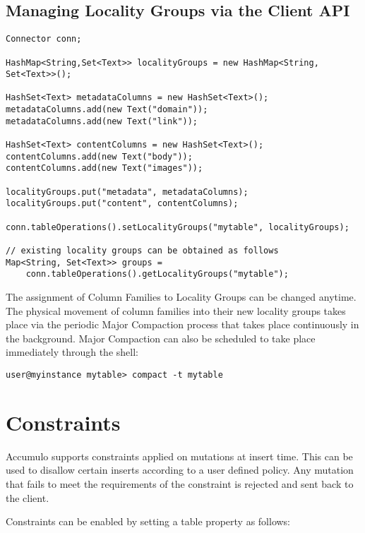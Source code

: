 \subsection{Managing Locality Groups via the Client API}

\begingroup\fontsize{8pt}{8pt}\selectfont\begin{verbatim}
Connector conn;

HashMap<String,Set<Text>> localityGroups = new HashMap<String, Set<Text>>();

HashSet<Text> metadataColumns = new HashSet<Text>();
metadataColumns.add(new Text("domain"));
metadataColumns.add(new Text("link"));

HashSet<Text> contentColumns = new HashSet<Text>();
contentColumns.add(new Text("body"));
contentColumns.add(new Text("images"));

localityGroups.put("metadata", metadataColumns);
localityGroups.put("content", contentColumns);

conn.tableOperations().setLocalityGroups("mytable", localityGroups);

// existing locality groups can be obtained as follows
Map<String, Set<Text>> groups =
    conn.tableOperations().getLocalityGroups("mytable");
\end{verbatim}\endgroup

The assignment of Column Families to Locality Groups can be changed anytime. The
physical movement of column families into their new locality groups takes place via
the periodic Major Compaction process that takes place continuously in the
background. Major Compaction can also be scheduled to take place immediately
through the shell:

\begingroup\fontsize{8pt}{8pt}\selectfont\begin{verbatim}
user@myinstance mytable> compact -t mytable
\end{verbatim}\endgroup

\section{Constraints}

Accumulo supports constraints applied on mutations at insert time. This can be
used to disallow certain inserts according to a user defined policy. Any mutation
that fails to meet the requirements of the constraint is rejected and sent back to the
client.

Constraints can be enabled by setting a table property as follows:

